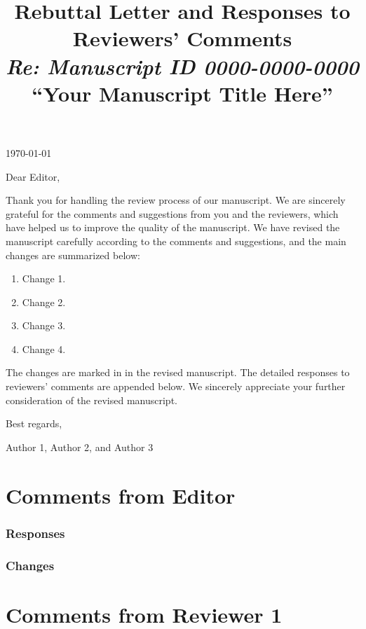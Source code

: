 \documentclass[12pt]{article}
\title{\textbf{\LARGE Rebuttal Letter and Responses to Reviewers' Comments}
\\[-.5em]
\textit{\large Re: Manuscript ID 0000-0000-0000}
\\[-.5em]
\textbf{\large ``Your Manuscript Title Here''}
\vspace{-2em}
}
\begin{document}
\date{}
\maketitle

\thispagestyle{firststyle}

\noindent
\today

\noindent
Dear Editor,
\medskip

Thank you for handling the review process of our manuscript.
We are sincerely grateful for the comments and suggestions from you and the reviewers, which have helped us
to improve the quality of the manuscript. We have revised the manuscript carefully according to
the comments and suggestions, and the main changes are summarized below:
\begin{enumerate}
    \item Change 1.
    \item Change 2.
    \item Change 3.
    \item Change 4.
\end{enumerate}

The changes are marked in  in the revised manuscript.
The detailed responses to reviewers' comments are appended below.
We sincerely appreciate your further consideration of the revised manuscript.


\medskip
\noindent
Best regards,

\medskip
\noindent
Author 1, Author 2, and Author 3

\newpage
\section{Comments from Editor}
\begin{commentbox}
    \lipsum[1]
\end{commentbox}

\subsubsection*{Responses}
\lipsum[2]

\subsubsection*{Changes}
\lipsum[3]


\newpage
\section{Comments from Reviewer 1}
\end{document}
